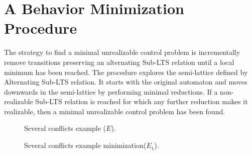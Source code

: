 \section{A Behavior Minimization Procedure}\label{sect:solution}

The strategy to find a minimal unrealizable control problem is incrementally remove transitions preserving an alternating Sub-LTS relation until a local minimum has been reached.  
The procedure explores the semi-lattice defined by Alternating Sub-LTS relation. It starts with the original automaton and moves downwards in the semi-lattice by performing minimal reductions. If a non-realizable Sub-LTS relation is reached for which any further reduction makes it realizable, then a minimal unrealizable control problem has been found.



  
\begin{figure}[bt]
\centering
\SmallPicture
{}
\caption{Several conflicts example ($E$).}
\label{fig:fig.several-conflicts}
\MediumPicture
\end{figure}

\begin{figure}[bt]
\centering
\SmallPicture
{}
\caption{Several conflicts example minimization($E_1$).}
\label{fig:fig.several-conflicts-min1}
\MediumPicture
\end{figure}

